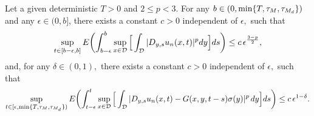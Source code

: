 \documentclass[10pt,a4paper]{amsart}
\begin{document}
\begin{proposition}
Let a given deterministic $T>0 $ and $ 2 \leq p < 3. $ For any $b\in(0,\min\{T,\tau_M,\tau_{M_{\rm d}}\})$ and any $\epsilon\in(0,b]$, there exists a constant $ c > 0 $ independent of $\epsilon, $ such that
\begin{equation}\label{51}
\sup_{t\in[b-\epsilon,b]}
E\biggl{(}\int_{b-\epsilon}^b\sup_{x\in\mathcal{D}} \Big{[}\int_{\mathcal{D}}|D_{y,s}u_n(x,t)|^p dy\Big{]} ds\biggr{)}\leq c\,\epsilon^{\frac{3-p}{2}},
\end{equation}
and, for any $ \delta\in (0,1), $ there exists a constant $ c > 0 $ independent of $\epsilon, $ such that
\begin{equation}\label{52}
\sup_{t\in [\epsilon,\min\{T,\tau_M,\tau_{M_{\rm
d}}\})} E\biggl{(}\int_{t-\epsilon}^t \sup_{x\in\mathcal{D}}
\Big{[}\int_{\mathcal{D}}|D_{y,s}u_n(x,t)-G(x,y,t-s)\sigma(y)|^p\,dy\Big{]}
ds\biggr{)}\\
\leq c\,\epsilon^{1-\delta}.
\end{equation}
\end{proposition}
\end{document}
